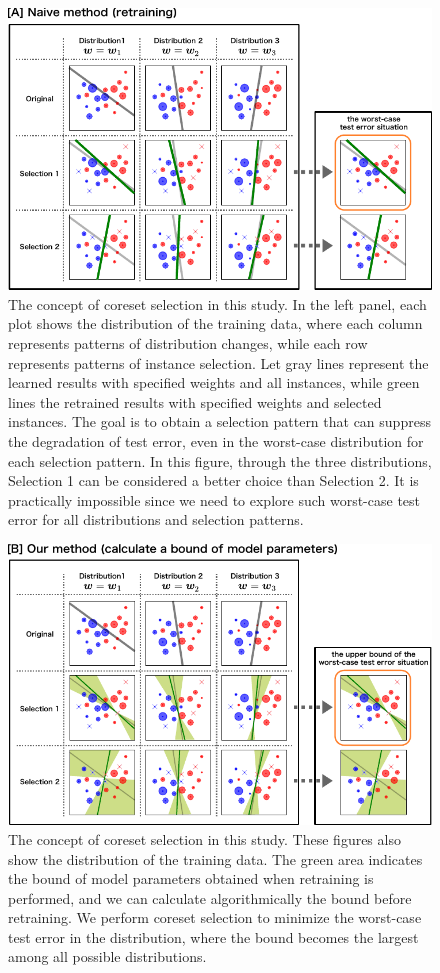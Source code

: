 \begin{figure}[H]
	\centering
	\includegraphics[width=0.8\hsize]{fig/concept1.pdf}
	\caption{
	The concept of coreset selection in this study.
	In the left panel, each plot shows the distribution of the training data, where each column represents patterns of distribution changes, while each row represents patterns of instance selection.
	Let gray lines represent the learned results with specified weights and all instances, while green lines the retrained results with specified weights and selected instances.
	The goal is to obtain a selection pattern that can suppress the degradation of test error, even in the worst-case distribution for each selection pattern.
	In this figure, through the three distributions, Selection 1 can be considered a better choice than Selection 2.
	It is practically impossible since we need to explore such worst-case test error for all distributions and selection patterns.
	}
	\label{fig:concept1}
\end{figure}

\begin{figure}[H]
	\centering
	\includegraphics[width=0.8\hsize]{fig/concept2.pdf}
	\caption{
	The concept of coreset selection in this study.
	These figures also show the distribution of the training data.
	The green area indicates the bound of model parameters obtained when retraining is performed, and we can calculate algorithmically the bound before retraining.
	We perform coreset selection to minimize the worst-case test error in the distribution, where the bound becomes the largest among all possible distributions.
	}
	\label{fig:concept2}
\end{figure}

